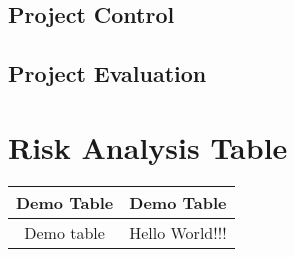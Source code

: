 \documentclass[11pt, a4paper, notitlepage]{report}
\begin{document}
\section{Project Control}
\section{Project Evaluation}

\appendix
\chapter{Risk Analysis Table}\label{app:RiskAnalysis}
\begin{tabular}{|c|c|}
	\hline
	Demo Table & Demo Table \\
	\hline
	Demo table & Hello World!!! \\
	\hline
\end{tabular}
\end{document}
